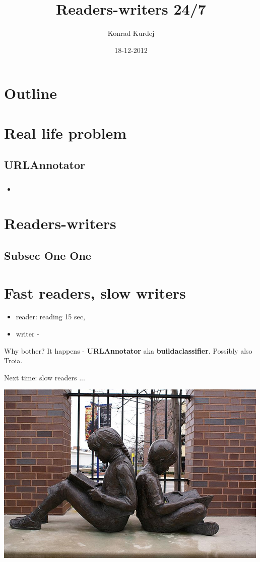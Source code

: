 \documentclass{beamer}
\title{Readers-writers 24/7}
\author{Konrad Kurdej}
\date{18-12-2012}
\begin{document}
\begin{frame}
\titlepage
\end{frame}
\section*{Outline}
\begin{frame}
\tableofcontents
\end{frame}

\section{Real life problem}
\subsection{URLAnnotator}
\begin{frame}
\frametitle{}
\begin{itemize}
 \item 
\end{itemize}
\end{frame}
\section{Readers-writers}
\subsection{Subsec One One}

\section{Fast readers, slow writers}
\begin{frame}
\begin{itemize}
 \item reader: reading 15 sec, 
 \item writer - 
\end{itemize}
\pause
\begin{block}{Why bother?}
\pause
It happens - \textbf{URLAnnotator} aka \textbf{buildaclassifier}.
Possibly also Troia.
\end{block}
\end{frame}

\begin{frame}

Next time: slow readers ...

\begin{center}
\includegraphics[scale=0.5]{slow_readers.jpg} 

\end{center}
\end{frame}
\end{document}
